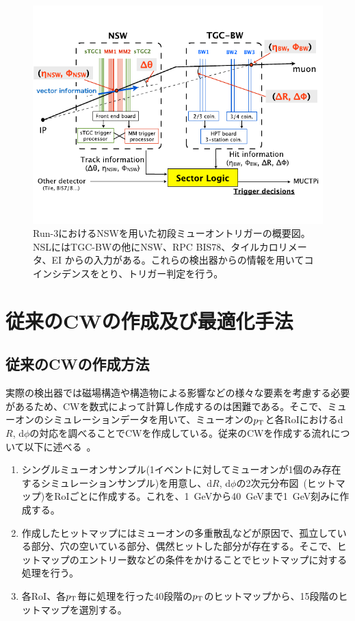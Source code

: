 \begin{figure}[tb]
  \centering
  \includegraphics[clip, width=14cm]{fig/2/NSW_innercoin.pdf}
  \caption{Run-3におけるNSWを用いた初段ミューオントリガーの概要図\cite{article:phase1}。NSLにはTGC-BWの他にNSW、RPC BIS78、タイルカロリメータ、EI からの入力がある。これらの検出器からの情報を用いてコインシデンスをとり、トリガー判定を行う。}
  \label{fig:NSW_inner}
\end{figure}


\section{従来のCWの作成及び最適化手法}\label{section:最適化}
\subsection{従来のCWの作成方法}
実際の検出器では磁場構造や構造物による影響などの様々な要素を考慮する必要があるため、CWを数式によって計算し作成するのは困難である。そこで、ミューオンのシミュレーションデータを用いて、ミューオンの$p_{\rm{T}}$と各RoIにおけるd$R$, d$\phi$の対応を調べることでCWを作成している。従来のCWを作成する流れについて以下に述べる~\cite{article:shiomi-mron}。
\begin{enumerate}\label{table:makeCW}
   \item シングルミューオンサンプル(1イベントに対してミューオンが1個のみ存在するシミュレーションサンプル)を用意し、d$R$, d$\phi$の2次元分布図~(ヒットマップ)をRoIごとに作成する。これを、1~GeVから40~GeVまで1~GeV刻みに作成する。
   \item 作成したヒットマップにはミューオンの多重散乱などが原因で、孤立している部分、穴の空いている部分、偶然ヒットした部分が存在する。そこで、ヒットマップのエントリー数などの条件をかけることでヒットマップに対する処理を行う。
   \item 各RoI、各$p_{\rm{T}}$毎に処理を行った40段階の$p_{\rm{T}}$のヒットマップから、15段階のヒットマップを選別する。
\end{enumerate}



